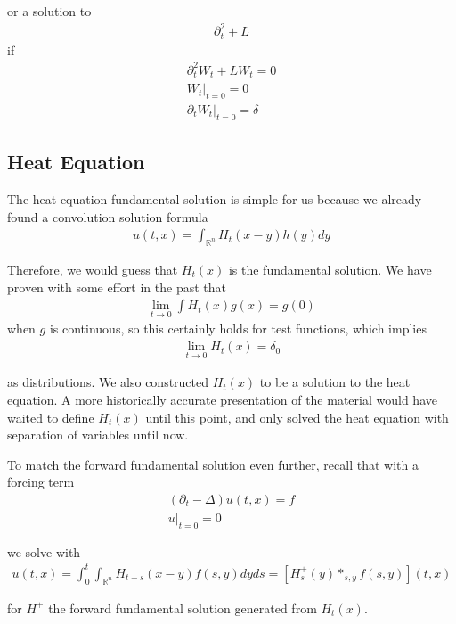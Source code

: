 \documentclass{article}
\newcommand{\R}{{\mathbb{R}}}
\newcommand{\pd}{\partial}
\begin{document}
	
	
	or a solution to 
	\begin{align*}
		\pd_{t}^{2}+L
	\end{align*}
	if
	\begin{align*}
		\pd_{t}^{2}W_{t} + LW_{t} = 0 \\
		W_{t} |_{t=0} = 0 \\
		\pd_{t} W_{t}|_{t=0} = \delta
	\end{align*}
	
	
	\subsection{Heat Equation}
	
	The heat equation fundamental solution is simple for us because we already found a convolution solution formula 
	\begin{align*}
		u(t,x) = \int_{\R^{n}} H_{t}(x-y) h(y)dy
	\end{align*}
	
	Therefore, we would guess that $H_{t}(x)$ is the fundamental solution. We have proven with some effort in the past  that 
	\begin{align*}
		\lim_{t \to 0} \int H_{t}(x)g(x) = g(0)
	\end{align*}
	when $g$ is continuous, so this certainly holds for test functions, which implies
	\begin{align*}
		\lim_{t \to 0} H_{t}(x) = \delta_0
	\end{align*}
	
	as distributions. We also constructed $H_{t}(x)$ to be a solution to the heat equation. A more historically accurate presentation of the material would have waited to define $H_{t}(x)$ until this point, and only solved the heat equation with separation of variables until now. 
	
	
	To match the forward fundamental solution even further, recall that with a forcing term 
	\begin{align*}
		(\pd_{t} - \Delta) u(t,x) = f \\ u|_{t = 0} = 0
	\end{align*}
	
	we solve with 
	\begin{align*}
		u(t,x) = \int_{0}^{t} \int_{\R^{n}} H_{t-s}(x-y)f(s,y)dyds = [H^{+}_{s}(y) *_{s,y} f(s,y)](t,x)
	\end{align*}
	
	for $H^{+}$ the forward fundamental solution generated from $H_{t}(x)$. 
	
\end{document}

